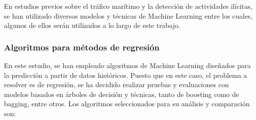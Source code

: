 \documentclass[12pt]{article}
\begin{document}
	En estudios previos sobre el tráfico marítimo y la detección de actividades ilícitas, se han utilizado diversos modelos y técnicas de Machine Learning entre los cuales, algunos de ellos serán utilizados a lo largo de este trabajo.
	
		\subsubsection{Algoritmos para métodos de regresión}
		En este estudio, se han empleado algoritmos de Machine Learning diseñados para la predicción a partir de datos históricos. Puesto que en este caso, el problema a resolver es de regresión, se ha decidido realizar pruebas y evaluaciones con modelos basados en árboles de decisión y técnicas, tanto de boosting como de bagging, entre otros. Los algoritmos seleccionados para su análisis y comparación son:
		
\end{document}
